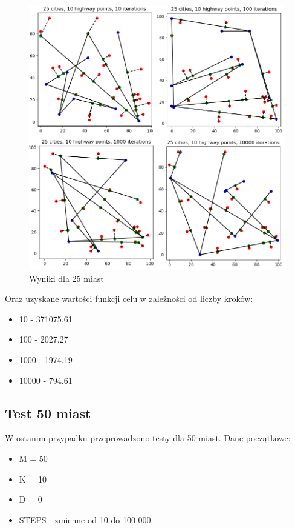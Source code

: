 \documentclass[a4paper]{article}
\begin{document}
\begin{figure}[h!]
\centering
\includegraphics[width=12cm]{25_cities}
\caption{Wyniki dla 25 miast}
\end{figure}

Oraz uzyskane wartości funkcji celu w zależności od liczby kroków:
\begin{itemize}
\item 10 - 371075.61
\item 100 - 2027.27
\item 1000 - 1974.19
\item 10000 - 794.61
\end{itemize}

\subsection{Test 50 miast}

W ostanim przypadku przeprowadzono testy dla 50 miast. Dane początkowe:
\begin{itemize}
\item M = 50
\item K = 10
\item D = 0
\item STEPS - zmienne od 10 do 100 000
\end{itemize}
\end{document}
